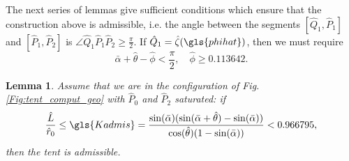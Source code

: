 \documentclass[reqno]{amsart}
\theoremstyle{definition} \newtheorem{definition}{Definition}[section]
\theoremstyle{definition} \newtheorem{remark}[definition]{Remark}
\theoremstyle{plain} \newtheorem{lemma}[definition]{Lemma}
\theoremstyle{plain} \newtheorem{proposition}[definition]{Proposition}
\theoremstyle{plain} \newtheorem{theorem}[definition]{Theorem}
\theoremstyle{plain} \newtheorem{corollary}[definition]{Corollary}
\theoremstyle{definition} \newtheorem{example}[definition]{Example}
\theoremstyle{plain} \newtheorem{claim}[clai]{Claim}
\theoremstyle{definition} \newtheorem{assumption}[definition]{Assumption}
\theoremstyle{definition} \newtheorem{observation}[definition]{Observation}
\newcommand{\1}{\mathbbm 1}
\numberwithin{equation}{section} %
\theoremstyle{plain} \newtheorem*{theorem*}{Theorem}
\theoremstyle{plain} \newtheorem{mthm}[maintheorem]{Main Theorem}
\theoremstyle{plain} \newtheorem*{mthm*}{Main Theorem}
\theoremstyle{plain} \newtheorem*{conjecture*}{Conjecture}
\theoremstyle{plain} \newtheorem{conjecture}[definition]{Conjecture}
\theoremstyle{plain} \newtheorem*{problem*}{Problem}
\begin{document}
 The next series of lemmas give sufficient conditions which ensure that the construction above is admissible, i.e. the angle between the segments $[\hat Q_1,\hat P_1]$ and $[\hat P_1,\hat P_2]$ is $\angle \hat Q_1\hat P_1\hat P_2\geq\frac{\pi}{2}$. If  $\hat Q_1 = \hat \zeta(\gls{phihat})$, then we must require %
\begin{equation*}
\bar \alpha + \hat \theta - \hat \phi < \frac{\pi}{2}, \quad \hat \phi \geq 0.113642.
\end{equation*}
\begin{lemma}
\label{Lem:when_tent}
Assume that we are in the configuration of Fig. \ref{Fig:tent_comput_geo} {\color{red}with $\hat P_0$ and $\hat P_2$ saturated}: if 
\begin{equation*}
\frac{\hat L}{\hat r_0} \leq \gls{Kadmis} = \frac{\sin(\bar \alpha) (\sin(\bar \alpha + \hat \theta) - \sin(\bar \alpha))}{\cos(\hat \theta) (1 - \sin(\bar \alpha))} < 0.966795,
\end{equation*}
then the tent is admissible.
\end{lemma}

\end{document}
